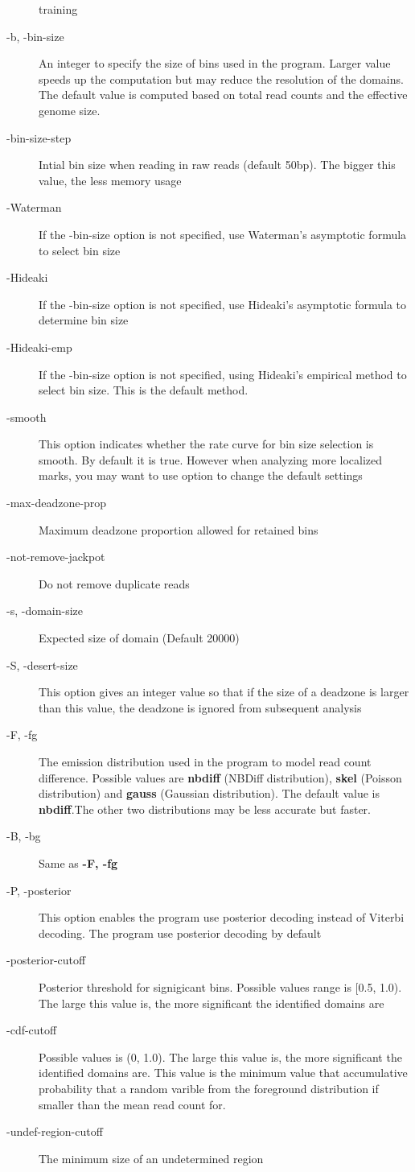 \documentclass[11pt]{report}
\begin{document}
\begin{description}
  training
\item[-b, -bin-size] An integer to specify the size of bins used in
  the program. Larger value speeds up the computation but may reduce
  the resolution of the domains. The default value is computed based
  on total read counts and the effective genome size.
\item[-bin-size-step] Intial bin size when reading in raw reads
  (default 50bp). The bigger this value, the less memory usage
\item[-Waterman] If the -bin-size option is not specified, use
  Waterman's asymptotic formula to select bin size
\item[-Hideaki] If the -bin-size option is not specified, use
  Hideaki's asymptotic formula to determine bin size
\item[-Hideaki-emp] If the -bin-size option is not specified, using
  Hideaki's empirical method to select bin size. This is the default
  method.
\item[-smooth] This option indicates whether the rate curve for bin
  size selection is smooth. By default it is true. However when
  analyzing more localized marks, you may want to use option to change
  the default settings
\item[-max-deadzone-prop] Maximum deadzone proportion allowed for
  retained bins
\item[-not-remove-jackpot] Do not remove duplicate reads
\item[-s, -domain-size] Expected size of domain (Default 20000) 
\item[-S, -desert-size] This option gives an integer value so that if
  the size of a deadzone is larger than this value, the deadzone is
  ignored from subsequent analysis
\item[-F, -fg] The emission distribution used in the program to model
  read count difference. Possible values are \textbf{nbdiff} (NBDiff
  distribution), \textbf{skel} (Poisson distribution) and
  \textbf{gauss} (Gaussian distribution). The default value is
  \textbf{nbdiff}.The other two distributions may be less accurate but
  faster.
\item[-B, -bg] Same as \textbf{-F, -fg} 
\item[-P, -posterior] This option enables the program use posterior
  decoding instead of Viterbi decoding. The program use posterior
  decoding by default
\item[-posterior-cutoff] Posterior threshold for signigicant
  bins. Possible values range is [0.5, 1.0). The large this value is,
  the more significant the identified domains are
\item[-cdf-cutoff] Possible values is (0, 1.0). The large this value
  is, the more significant the identified domains are. This value is
  the minimum value that accumulative probability that a random
  varible from the foreground distribution if smaller than the mean
  read count for.
\item[-undef-region-cutoff] The minimum size of an undetermined region
\end{description}
\end{document}
